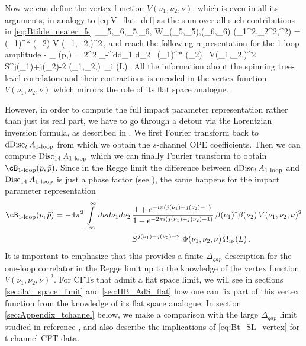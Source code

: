 Now we can define the vertex function  $V (\nu_1,\nu_2,\nu)$, which is even in all its arguments, in analogy to \eqref{eq:V_flat_def} as the sum over all such contributions in \eqref{eq:Btilde_neater_fs}
	\bea
		\sum\limits_{\De_5,\De_6,\rho_5,\rho_6,}
		W_{(\De_5,\rho_5),(\De_6,\rho_6)} \big(\nu_1^2,\nu_2^2,\nu^2\big)
		= \beta (\nu_1)^* \beta (\nu_2) V (\nu_1,\nu_2,\nu)^2\,,
and reach the following representation for the 1-loop amplitude
	\bea
		- \Re \cB_{} (p,\pb) = 2\pi^2  \int\limits_{-\infty}^\infty  d\nu d\nu_1  d\nu_2 \, \beta(\nu_1)^* \beta(\nu_2)
		 \, V(\nu_1,\nu_2,\nu)^2
		  \\ S^{j(\nu_1)+j(\nu_2)-2} \Phi(\nu_1,\nu_2,\nu)\, \Omega_{i \nu} (L)\,.
All the information about the spinning tree-level correlators and their contractions is encoded in the vertex function $V(\nu_1,\nu_2,\nu)$ which  mirrors the role of its flat space analogue.


However, in order to compute the full impact parameter representation rather than just its real part, we have to go through a detour via the Lorentzian inversion formula, as described in \cite{Meltzer:2019pyl}.
We first Fourier transform back to $\text{dDisc}_t \, A_{\text{1-loop}}$ from which we obtain the $s$-channel OPE coefficients.
Then we can compute $\operatorname{Disc}_{14} A_{\text{1-loop}}$ which we can finally Fourier transform to obtain $\cB_{\text{1-loop}}(p,\pb)$. Since in the Regge limit the difference between $\text{dDisc}_t \, A_{\text{1-loop}}$ and $\operatorname{Disc}_{14} A_{\text{1-loop}}$ is just a phase factor (see \cite{Meltzer:2019pyl}), the same happens for the impact parameter representation
	\begin{align}
		\cB_{\text{1-loop}} (p,\pb) =  -4\pi^2 \int\limits_{-\infty}^\infty d\nu d\nu_1 d\nu_2 \, & \frac{1 + e^{-i \pi (j(\nu_1)+j(\nu_2)-1)}}{1 - e^{-2 \pi i (j(\nu_1)+j(\nu_2)-1)}} \, \beta(\nu_1)^* \beta(\nu_2) \,V(\nu_1,\nu_2,\nu)^2
		       \nonumber \\ &
S^{j(\nu_1)+j(\nu_2)-2} \; \Phi(\nu_1,\nu_2,\nu)\, \Omega_{i \nu} (L)  \,.
	\label{eq:B_SL_vertex}
	\end{align}
It is important to emphasize that this provides a finite $\Delta_{gap}$ description for the one-loop correlator in the Regge limit up to the knowledge of the vertex function $V(\nu_1,\nu_2,\nu)^2$. For CFTs that admit a flat space limit, 
we will see in  sections \ref{sec:flat_space_limit} and \ref{sec:IIB_AdS_flat} how one can fix part of this vertex function from the knowledge of its flat space analogue. In section \ref{sec:Appendix_tchannel} below, we make a comparison with the large $\Delta_{gap}$ limit studied in reference \cite{Meltzer:2019pyl}, and also describe the implications of \eqref{eq:Bt_SL_vertex} for t-channel CFT data.

